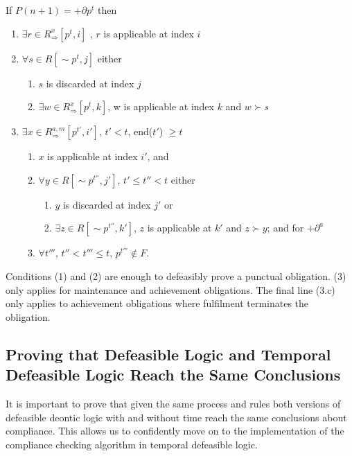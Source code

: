 \documentclass[10pt]{report}
\begin{document}
\begin{mydef} \label{def-temporal-proof}
If $P(n+1) = +\partial p^t$ then
\begin{enumerate}
\item $\exists r \in R^{x}_{\Rightarrow}\left[p^t,i\right]$ , $r$ is applicable at index $i$
\item $\forall s \in R[\sim p^t, j]$ either
      \begin{enumerate}
      \item $s$ is discarded at index $j$
      \item $\exists w \in R^{x}_{\Rightarrow}\left[p^t,k\right]$, w is applicable at index $k$ and $w\succ s$
      \end{enumerate}
\item $\exists x \in R^{a,m}_{\Rightarrow}\left[p^{t'},i'\right]$, $t' < t$, end($t'$) $\geq t$
      \begin{enumerate}
      \item $x$ is applicable at index $i'$, and
      \item $\forall y \in R\left[\sim p^{t''},j'\right]$, $t' \leq t'' < t$ either
            \begin{enumerate}
            \item $y$ is discarded at index $j'$ or
            \item $\exists z \in R\left[\sim p^{t''},k'\right]$, $z$ is applicable at $k'$ and $z\succ y$; and for $+\partial^a$
            \end{enumerate}
      \item $\forall t'''$, $t''<t'''\leq t$, $p^{t'''} \notin F$.
      \end{enumerate}
\end{enumerate}
\end{mydef}

Conditions (1) and (2) are enough to defeasibly prove a punctual obligation. (3) only applies for maintenance and achievement obligations. The final line (3.c) only applies to achievement obligations where fulfilment terminates the obligation.

\subsection{Proving that Defeasible Logic and Temporal Defeasible Logic Reach the Same Conclusions}

It is important to prove that given the same process and rules both versions of defeasible deontic logic with and without time reach the same conclusions about compliance. This allows us to confidently move on to the implementation of the compliance checking algorithm in temporal defeasible logic.
\end{document}
